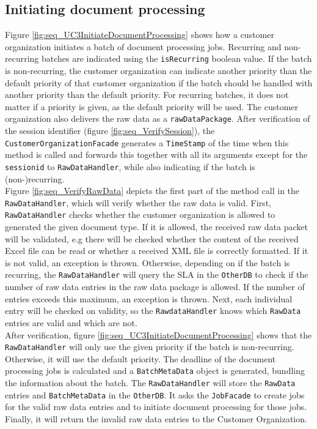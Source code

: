 \documentclass[a4paper,10pt]{article}
\begin{document}
\FloatBarrier

\subsection{Initiating document processing}
Figure \ref{fig:seq_UC3InitiateDocumentProcessing} shows how a customer organization initiates a batch of document processing jobs. Recurring and non-recurring batches are indicated using the \texttt{isRecurring} boolean value. If the batch is non-recurring, the customer organization can indicate another priority than the default priority of that customer organization if the batch should be handled with another priority than the default priority.  For recurring batches, it does not matter if a priority is given, as the default priority will be used. The customer organization also delivers the raw data as a \texttt{rawDataPackage}. After verification of the session identifier (figure \ref{fig:seq_VerifySession}), the \texttt{CustomerOrganizationFacade} generates a \texttt{TimeStamp} of the time when this method is called and forwards this together with all its arguments except for the \texttt{sessionid} to \texttt{RawDataHandler}, while also indicating if the batch is (non-)recurring.\\

Figure \ref{fig:seq_VerifyRawData} depicts the first part of the method call in the \texttt{RawDataHandler}, which will verify whether the raw data is valid. First, \texttt{RawDataHandler} checks whether the customer organization is allowed to generated the given document type. If it is allowed, the received raw data packet will be validated, e.g  there will be checked whether the content of the received Excel file can be read or whether a received XML file is correctly formatted. If it is not valid, an exception is thrown. Otherwise, depending on if the batch is  recurring, the \texttt{RawDataHandler} will query the SLA in the \texttt{OtherDB} to check if the number of raw data entries in the raw data package is allowed. If the number of entries exceeds this maximum, an exception is thrown. Next, each individual entry will be checked on validity, so the \texttt{RawdataHandler} knows which \texttt{RawData} entries are valid and which are not.\\

After verification, figure \ref{fig:seq_UC3InitiateDocumentProcessing} shows that the \texttt{RawDataHandler} will only use the given priority if the batch is non-recurring. Otherwise, it will use the default priority. The deadline of the document processing jobs is calculated and a \texttt{BatchMetaData} object is generated, bundling the information about the batch. The \texttt{RawDataHandler} will store the \texttt{RawData} entries and \texttt{BatchMetaData} in the \texttt{OtherDB}. It asks the \texttt{JobFacade} to create jobs for the valid raw data entries and to initiate document processing for those jobs. Finally, it will return the invalid raw data entries to the Customer Organization.\\
\end{document}
